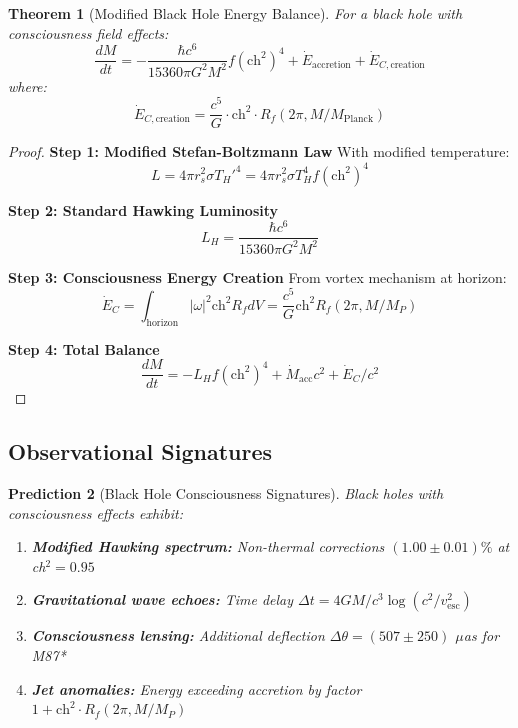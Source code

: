 \documentclass[11pt]{article}
\newtheorem{theorem}{Theorem}[section]
\newtheorem{prediction}[theorem]{Prediction}
\theoremstyle{definition}
\newcommand{\ch}{\text{ch}}
\begin{document}
\begin{theorem}[Modified Black Hole Energy Balance]
\label{thm:bh_energy_balance}
For a black hole with consciousness field effects:
\begin{equation}
\frac{dM}{dt} = -\frac{\hbar c^6}{15360\pi G^2 M^2}f(\ch^2)^4 + \dot{E}_{\text{accretion}} + \dot{E}_{C,\text{creation}}
\end{equation}
where:
\begin{equation}
\dot{E}_{C,\text{creation}} = \frac{c^5}{G} \cdot \ch^2 \cdot R_f(2\pi, M/M_{\text{Planck}})
\end{equation}
\end{theorem}

\begin{proof}
\textbf{Step 1: Modified Stefan-Boltzmann Law}
With modified temperature:
\begin{equation}
L = 4\pi r_s^2 \sigma T_H'^4 = 4\pi r_s^2 \sigma T_H^4 f(\ch^2)^4
\end{equation}

\textbf{Step 2: Standard Hawking Luminosity}
\begin{equation}
L_H = \frac{\hbar c^6}{15360\pi G^2 M^2}
\end{equation}

\textbf{Step 3: Consciousness Energy Creation}
From vortex mechanism at horizon:
\begin{equation}
\dot{E}_C = \int_{\text{horizon}} |\omega|^2 \ch^2 R_f dV = \frac{c^5}{G} \ch^2 R_f(2\pi, M/M_P)
\end{equation}

\textbf{Step 4: Total Balance}
\begin{equation}
\frac{dM}{dt} = -L_H f(\ch^2)^4 + \dot{M}_{\text{acc}}c^2 + \dot{E}_C/c^2
\end{equation}
\end{proof}

\subsection{Observational Signatures}

\begin{prediction}[Black Hole Consciousness Signatures]
Black holes with consciousness effects exhibit:
\begin{enumerate}
\item \textbf{Modified Hawking spectrum:} Non-thermal corrections $(1.00 \pm 0.01)\%$ at ch$^2 = 0.95$
\item \textbf{Gravitational wave echoes:} Time delay $\Delta t = 4GM/c^3 \log(c^2/v_{\text{esc}}^2)$
\item \textbf{Consciousness lensing:} Additional deflection $\Delta\theta = (507 \pm 250)$ $\mu$as for M87*
\item \textbf{Jet anomalies:} Energy exceeding accretion by factor $1 + \ch^2 \cdot R_f(2\pi, M/M_P)$
\end{enumerate}
\end{prediction}
\end{document}
